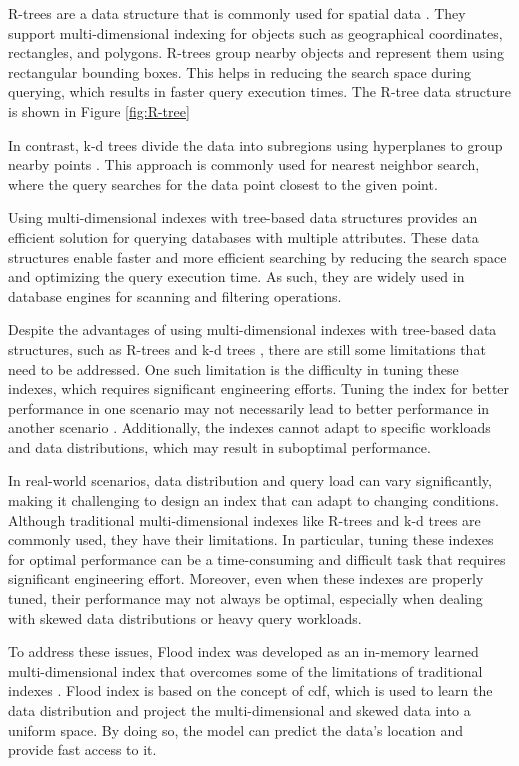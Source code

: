 R-trees are a data structure that is commonly used for spatial data \cite{r-tree}. They support multi-dimensional indexing for objects such as geographical coordinates, rectangles, and polygons. R-trees group nearby objects and represent them using rectangular bounding boxes. This helps in reducing the search space during querying, which results in faster query execution times. The R-tree data structure is shown in Figure \ref{fig:R-tree}

In contrast, k-d trees divide the data into subregions using hyperplanes to group nearby points \cite{kdtree}. This approach is commonly used for nearest neighbor search, where the query searches for the data point closest to the given point.

Using multi-dimensional indexes with tree-based data structures provides an efficient solution for querying databases with multiple attributes. These data structures enable faster and more efficient searching by reducing the search space and optimizing the query execution time. As such, they are widely used in database engines for scanning and filtering operations.


Despite the advantages of using multi-dimensional indexes with tree-based data structures, such as R-trees \cite{r-tree} and k-d trees \cite{kdtree}, there are still some limitations that need to be addressed. One such limitation is the difficulty in tuning these indexes, which requires significant engineering efforts. Tuning the index for better performance in one scenario may not necessarily lead to better performance in another scenario \cite{FloodLMD}. Additionally, the indexes cannot adapt to specific workloads and data distributions, which may result in suboptimal performance.

In real-world scenarios, data distribution and query load can vary significantly, making it challenging to design an index that can adapt to changing conditions. Although traditional multi-dimensional indexes like R-trees and k-d trees are commonly used, they have their limitations. In particular, tuning these indexes for optimal performance can be a time-consuming and difficult task that requires significant engineering effort. Moreover, even when these indexes are properly tuned, their performance may not always be optimal, especially when dealing with skewed data distributions or heavy query workloads.

To address these issues, Flood index was developed as an in-memory learned multi-dimensional index that overcomes some of the limitations of traditional indexes \cite{FloodLMD}. Flood index is based on the concept of \acrfull{cdf}, which is used to learn the data distribution and project the multi-dimensional and skewed data into a uniform space. By doing so, the model can predict the data's location and provide fast access to it.

